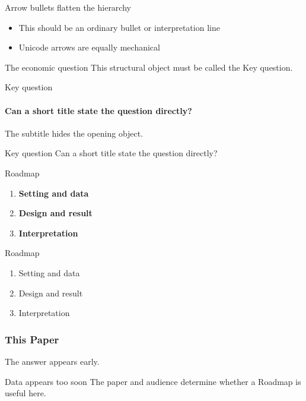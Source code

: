 \documentclass[11pt, aspectratio=169]{beamer}
\begin{document}
\begin{frame}{Arrow bullets flatten the hierarchy}
  \begin{itemize}
    \item[$\Rightarrow$] This should be an ordinary bullet or interpretation line
    \item[→] Unicode arrows are equally mechanical
  \end{itemize}
\end{frame}

\begin{frame}{The economic question}
  This structural object must be called the Key question.
\end{frame}

\begin{frame}{Key question}
  \framesubtitle{Can a \textcolor{cAccentA}{short title} state the question directly?}
  The subtitle hides the opening object.
\end{frame}

\begin{frame}{Key question}
  Can a short title state the question directly?
\end{frame}

\begin{frame}{Roadmap}
  \begin{enumerate}
    \item \textbf{Setting and data}
    \item \textbf{Design and result}
    \item \textbf{Interpretation}
  \end{enumerate}
\end{frame}

\begin{frame}{Roadmap}
  \begin{enumerate}
    \item Setting and data
    \item Design and result
    \item Interpretation
  \end{enumerate}
\end{frame}

\begin{frame}
  \frametitle{This Paper}
  The answer appears early.
\end{frame}
\begin{frame}{Data appears too soon}
  The paper and audience determine whether a Roadmap is useful here.
\end{frame}
\end{document}
